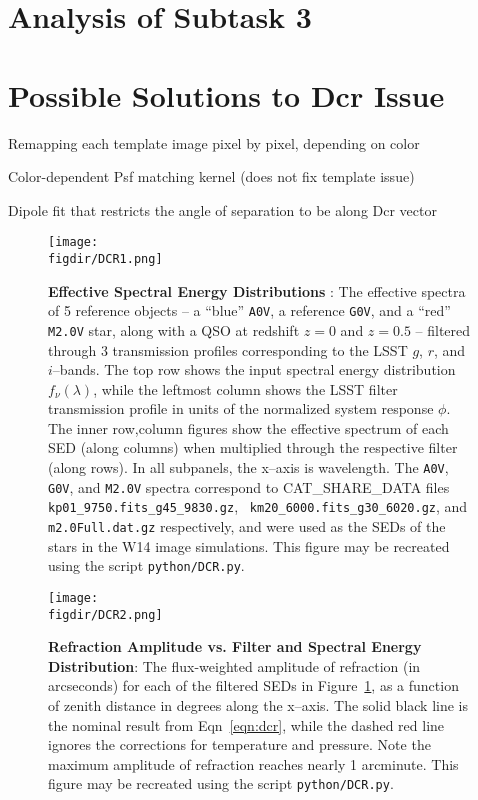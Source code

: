 \documentclass[prd, nofootinbib, floatfix, 11pt, tightenlines, times]{article}
\def\figdir{../figures}
\begin{document}
\section{Analysis of Subtask 3}

\section{Possible Solutions to Dcr Issue}

Remapping each template image pixel by pixel, depending on color

Color-dependent Psf matching kernel (does not fix template issue)

Dipole fit that restricts the angle of separation to be along Dcr vector


\clearpage
\begin{figure}[h!]
  \centering
  \texttt{[image: \\figdir/DCR1.png]}
  \caption{{\bf Effective Spectral Energy Distributions} : The
    effective spectra of 5 reference objects -- a ``blue'' {\tt A0V},
    a reference {\tt G0V}, and a ``red'' {\tt M2.0V} star, along with
    a QSO at redshift $z=0$ and $z=0.5$ -- filtered through 3
    transmission profiles corresponding to the LSST $g$, $r$, and
    $i$--bands.  The top row shows the input spectral energy
    distribution $f_\nu(\lambda)$, while the leftmost column shows the
    LSST filter transmission profile in units of the normalized
    system response $\phi$.  The inner row,column figures show the
    effective spectrum of each SED (along columns) when multiplied
    through the respective filter (along rows).  In all subpanels, the
    x--axis is wavelength.  The {\tt A0V}, {\tt G0V}, and {\tt M2.0V}
    spectra correspond to {CAT\_SHARE\_DATA} files {\tt
      kp01\_9750.fits\_g45\_9830.gz}, {\tt
      km20\_6000.fits\_g30\_6020.gz}, and {\tt m2.0Full.dat.gz}
    respectively, and were used as the SEDs of the stars in the W14
    image simulations.  This figure may be recreated using the script
    {\tt python/DCR.py}.}
  \label{fig:spectra}
\end{figure}

\clearpage
\begin{figure}[h!]
  \centering
  \texttt{[image: \\figdir/DCR2.png]}
  \caption{{\bf Refraction Amplitude vs. Filter and Spectral Energy
      Distribution}: The flux-weighted amplitude of refraction (in
    arcseconds) for each of the filtered SEDs in
    Figure~\ref{fig:spectra}, as a function of zenith distance in
    degrees along the x--axis.  The solid black line is the nominal
    result from Eqn~\ref{eqn:dcr}, while the dashed red line ignores
    the corrections for temperature and pressure.  Note the maximum
    amplitude of refraction reaches nearly 1 arcminute.  This figure
    may be recreated using the script {\tt python/DCR.py}.}
  \label{fig:refraction}
\end{figure}
\end{document}
